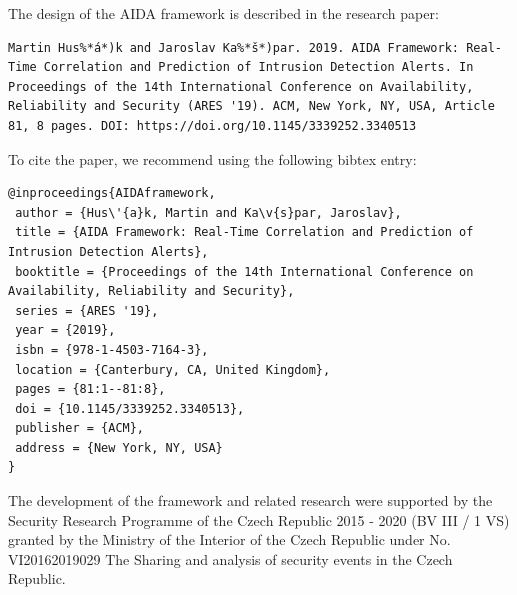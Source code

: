 \documentclass[a4paper]{article} %
\begin{document}
\bigskip

The design of the AIDA framework is described in the research paper:
\begin{lstlisting}[]
Martin Hus%*á*)k and Jaroslav Ka%*š*)par. 2019. AIDA Framework: Real-Time Correlation and Prediction of Intrusion Detection Alerts. In Proceedings of the 14th International Conference on Availability, Reliability and Security (ARES '19). ACM, New York, NY, USA, Article 81, 8 pages. DOI: https://doi.org/10.1145/3339252.3340513
\end{lstlisting}

To cite the paper, we recommend using the following bibtex entry:
\begin{lstlisting}[]
@inproceedings{AIDAframework,
 author = {Hus\'{a}k, Martin and Ka\v{s}par, Jaroslav},
 title = {AIDA Framework: Real-Time Correlation and Prediction of Intrusion Detection Alerts},
 booktitle = {Proceedings of the 14th International Conference on Availability, Reliability and Security},
 series = {ARES '19},
 year = {2019},
 isbn = {978-1-4503-7164-3},
 location = {Canterbury, CA, United Kingdom},
 pages = {81:1--81:8},
 doi = {10.1145/3339252.3340513},
 publisher = {ACM},
 address = {New York, NY, USA}
}
\end{lstlisting}

The development of the framework and related research were supported by the Security Research Programme of the Czech Republic 2015 - 2020 (BV III / 1 VS) granted by the Ministry of the Interior of the Czech Republic under No. VI20162019029 The Sharing and analysis of security events in the Czech Republic.
\end{document}
